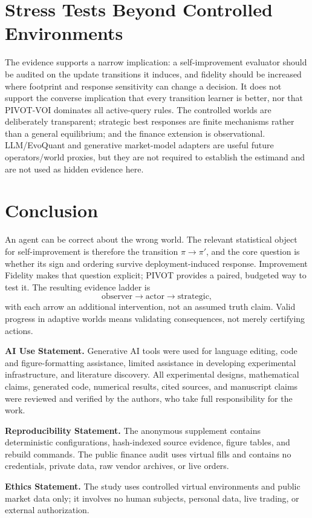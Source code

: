 \documentclass{article}
\begin{document}
\section{Stress Tests Beyond Controlled Environments}
The evidence supports a narrow implication: a self-improvement evaluator
should be audited on the update transitions it induces, and fidelity should
be increased where footprint and response sensitivity can change a decision.
It does not support the converse implication that every transition learner is
better, nor that PIVOT-VOI dominates all active-query rules.  The controlled
worlds are deliberately transparent; strategic best responses are finite
mechanisms rather than a general equilibrium; and the finance extension is
observational.  LLM/EvoQuant and generative market-model adapters are useful
future operators/world proxies, but they are not required to establish the
estimand and are not used as hidden evidence here.

\section{Conclusion}
An agent can be correct about the wrong world.  The relevant statistical object
for self-improvement is therefore the transition $\pi\to\pi'$, and the core
question is whether its sign and ordering survive deployment-induced response.
Improvement Fidelity makes that question explicit; PIVOT provides a paired,
budgeted way to test it.  The resulting evidence ladder is
\begin{equation}
  \text{observer} \longrightarrow \text{actor} \longrightarrow \text{strategic},
\end{equation}
with each arrow an additional intervention, not an assumed truth claim.
Valid progress in adaptive worlds means validating consequences, not merely
certifying actions.

\begingroup\scriptsize
\noindent\textbf{AI Use Statement.} Generative AI tools were used for language
editing, code and figure-formatting assistance, limited assistance in developing
experimental infrastructure, and literature discovery.  All experimental
designs, mathematical claims, generated code, numerical results, cited sources,
and manuscript claims were reviewed and verified by the authors, who take full
responsibility for the work.
\par\noindent\textbf{Reproducibility Statement.} The anonymous supplement
contains deterministic configurations, hash-indexed source evidence, figure
tables, and rebuild commands.  The public finance audit uses virtual fills and
contains no credentials, private data, raw vendor archives, or live orders.
\par\noindent\textbf{Ethics Statement.} The study uses controlled virtual
environments and public market data only; it involves no human subjects,
personal data, live trading, or external authorization.
\endgroup
\end{document}

